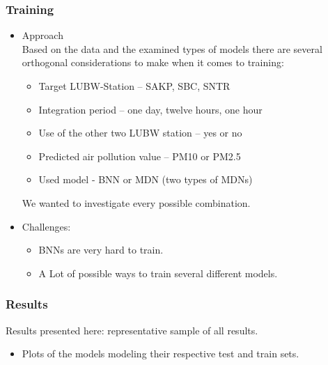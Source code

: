 \documentclass[18pt]{beamer}
\begin{document}
\begin{frame}
  \frametitle{Training}
  \begin{itemize}
  \item Approach \\
    Based on the data and the examined types of models there are several orthogonal considerations to make when it comes to training:
    \begin{itemize}
    \item Target LUBW-Station -- SAKP, SBC, SNTR
    \item Integration period -- one day, twelve hours, one hour
    \item Use of the other two LUBW station -- yes or no
    \item Predicted air pollution value -- PM10 or PM2.5
    \item Used model - BNN or MDN (two types of MDNs)
    \end{itemize}
    We wanted to investigate every possible combination.
  \item Challenges:
    \begin{itemize}
    \item BNNs are very hard to train.
    \item A Lot of possible ways to train several different models.
    \end{itemize}
  \end{itemize}
\end{frame}


\begin{frame}[t]
  \frametitle{Results}
  Results presented here: representative sample of all results.
  \pause
  \begin{itemize}
  \item Plots of the models modeling their respective test and train sets.
  \end{itemize}
\end{frame}
\end{document}
